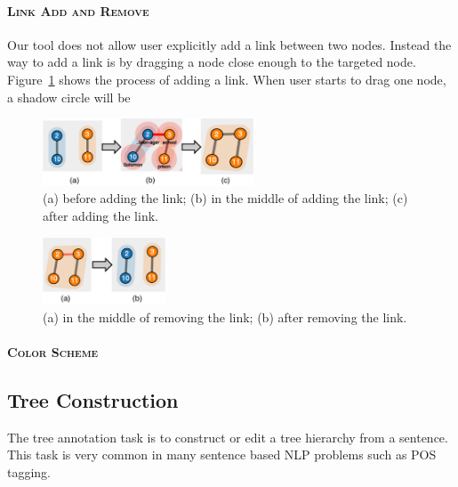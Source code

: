 \paragraph{\textsc{Link Add and Remove}\\}
Our tool does not allow user explicitly add a link between two nodes. Instead the way to add a link is by dragging a node close enough to the targeted node. Figure~\ref{fig:addlink} shows the process of adding a link. When user starts to drag one node, a shadow circle will be 

\begin{figure}[th]
\begin{center}
\includegraphics[height=2cm]{figs/addlink.pdf}
\caption{(a) before adding the link; (b) in the middle of adding the link; (c) after adding the link.}
\label{fig:addlink}
\end{center}
\end{figure}

\begin{figure}[th]
\begin{center}
\includegraphics[height=2cm]{figs/removelink.pdf}
\caption{(a) in the middle of removing the link; (b) after removing the link.}
\label{fig:rmlink}
\end{center}
\end{figure}

\paragraph{\textsc{Color Scheme}\\}

\subsection{Tree Construction}

The tree annotation task is to construct or edit a tree hierarchy from
a sentence. This task is very common in many sentence based NLP
problems such as POS tagging.

